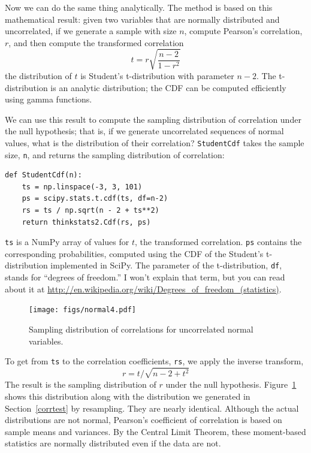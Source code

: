\documentclass[12pt]{book}
\theoremstyle{exercise}
\begin{document}
Now we can do the same thing analytically.  The method is based
on this mathematical result: given two variables that are normally distributed
and uncorrelated, if we generate a sample with size $n$,
compute Pearson's correlation, $r$, and then compute the transformed
correlation
%
\[ t = r \sqrt{\frac{n-2}{1-r^2}} \]
%
the distribution of $t$ is Student's t-distribution with parameter
$n-2$.  The t-distribution is an analytic distribution; the CDF can
be computed efficiently using gamma functions.%
%

We can use this result to compute the sampling distribution of
correlation under the null hypothesis; that is, if we generate
uncorrelated sequences of normal values, what is the distribution of
their correlation?  {\tt StudentCdf} takes the sample size, {\tt n}, and
returns the sampling distribution of correlation:%
%

\begin{verbatim}
def StudentCdf(n):
    ts = np.linspace(-3, 3, 101)
    ps = scipy.stats.t.cdf(ts, df=n-2)
    rs = ts / np.sqrt(n - 2 + ts**2)
    return thinkstats2.Cdf(rs, ps)
\end{verbatim}

{\tt ts} is a NumPy array of values for $t$, the transformed
correlation.  {\tt ps} contains the corresponding probabilities,
computed using the CDF of the Student's t-distribution implemented in
SciPy.  The parameter of the t-distribution, {\tt df}, stands for
``degrees of freedom.''  I won't explain that term, but you can read
about it at
\url{http://en.wikipedia.org/wiki/Degrees_of_freedom_(statistics)}.%
%
%
%
%

\begin{figure}
\centerline{\texttt{[image: figs/normal4.pdf]}}
\caption{Sampling distribution of correlations for uncorrelated
normal variables.}%
\label{normal4}
\end{figure}

To get from {\tt ts} to the correlation coefficients, {\tt rs},
we apply the inverse transform,
%
\[ r = t / \sqrt{n - 2 + t^2} \]
%
The result is the sampling distribution of $r$ under the null hypothesis.
Figure~\ref{normal4} shows this distribution along with the distribution
we generated in Section~\ref{corrtest} by resampling.  They are nearly
identical.  Although the actual distributions are not normal, 
Pearson's coefficient of correlation is based on sample means
and variances.  By the Central Limit Theorem, these moment-based
statistics are normally distributed even if the data are not.%
%
%
%
\end{document}
